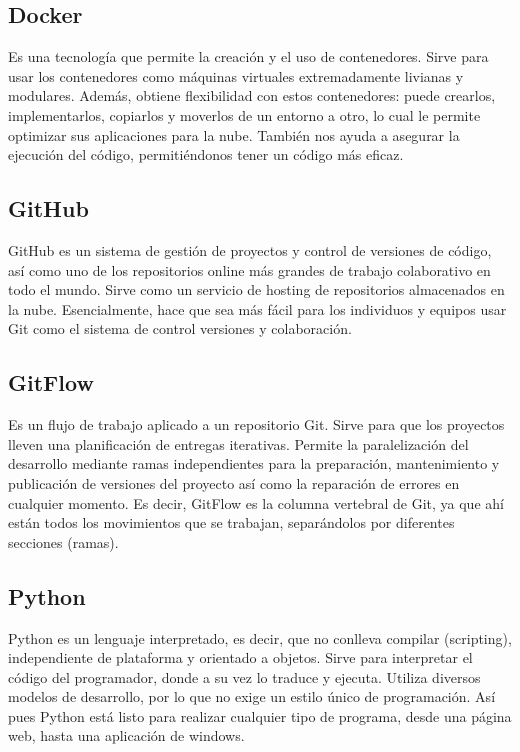 \documentclass[12pt,letterpaper]{article}
\begin{document}
\subsection*{Docker}
Es una tecnología que permite la creación y el uso de contenedores.
Sirve para usar los contenedores como máquinas virtuales extremadamente livianas y modulares.
Además, obtiene flexibilidad con estos contenedores: puede crearlos, implementarlos, copiarlos y
moverlos de un entorno a otro, lo cual le permite optimizar sus aplicaciones para la nube.
\citep{redhat_docker}
También nos ayuda a asegurar la ejecución del código, permitiéndonos tener un código más eficaz.

\subsection*{GitHub}
GitHub es un sistema de gestión de proyectos y control de versiones de código, así como uno de los
repositorios online más grandes de trabajo colaborativo en todo el mundo.
\citep{hostinger_tutoriales_2019}
Sirve como un servicio de hosting de repositorios almacenados en la nube. Esencialmente, hace que
sea más fácil para los individuos y equipos usar Git como el sistema de control versiones y colaboración.
\citep{kinsta_2020}

\subsection*{GitFlow}
Es un flujo de trabajo aplicado a un repositorio Git. Sirve para que los proyectos lleven una
planificación de entregas iterativas. Permite la paralelización del desarrollo mediante ramas
independientes para la preparación, mantenimiento y publicación de versiones del proyecto así como
la reparación de errores en cualquier momento.
\citep{claventy_2020}
Es decir, GitFlow es la columna vertebral de Git, ya que ahí están todos los movimientos que se trabajan, separándolos por diferentes secciones (ramas).

\subsection*{Python}
Python es un lenguaje interpretado, es decir, que no conlleva compilar (scripting), independiente de
plataforma y orientado a objetos. 
\citep{desarrollo_web_2003}
Sirve para interpretar el código del programador, donde a su vez lo traduce y ejecuta. Utiliza
diversos modelos de desarrollo, por lo que no exige un estilo único de programación.
\citep{angeles_2020}
Así pues Python está listo para realizar cualquier tipo de programa, desde una página web, hasta una aplicación de windows.
\end{document}
